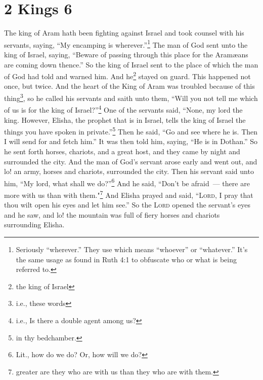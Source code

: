 \section{2 Kings 6}\label{2 Kings 6}
\begin{enumerate}
     The king of Aram hath been fighting against Israel and took counsel with his servants, saying, ``My encamping is wherever.''\footnote{Seriously ``wherever.'' They use  which means ``whoever'' or ``whatever.'' It's the same usage as found in Ruth 4:1 to obfuscate who or what is being referred to.}%
     The man of God sent unto the king of Israel, saying, ``Beware of passing through this place for the Aram\ae{}ans are coming down thence.''%
     So the king of Israel sent to the place of which the man of God had told and warned him. And he\footnote{the king of Israel} stayed on guard. This happened not once, but twice.%
     And the heart of the King of Aram was troubled because of this thing\footnote{i.e., these words}, so he called his servants and saith unto them, ``Will you not tell me which of us is for the king of Israel?''\footnote{i.e., Is there a double agent among us?}%
     One of the servants said, ``None, my lord the king. However, Elisha, the prophet that is in Israel, tells the king of Israel the things you have spoken in private.''\footnote{in thy bedchamber.}%
     Then he said, ``Go and see where he is. Then I will send for and fetch him.'' It was then told him, saying, ``He is in Dothan.''%
     So he sent forth horses, chariots, and a great host, and they came by night and surrounded the city.%
     And the man of God's servant arose early and went out, and lo! an army, horses and chariots, surrounded the city. Then his servant said unto him, ``My lord, what shall we do?''\footnote{Lit., how do we do? Or, how will we do?}%
     And he said, ``Don't be afraid~--- there are more with us than with them."\footnote{greater are they who are with us than they who are with them.}%
     And Elisha prayed and said, ``\textsc{Lord}, I pray that thou wilt open his eyes and let him see.'' So the \textsc{Lord} opened the servant's eyes and he saw, and lo! the mountain was full of fiery horses and chariots surrounding Elisha.%
\end{enumerate}
